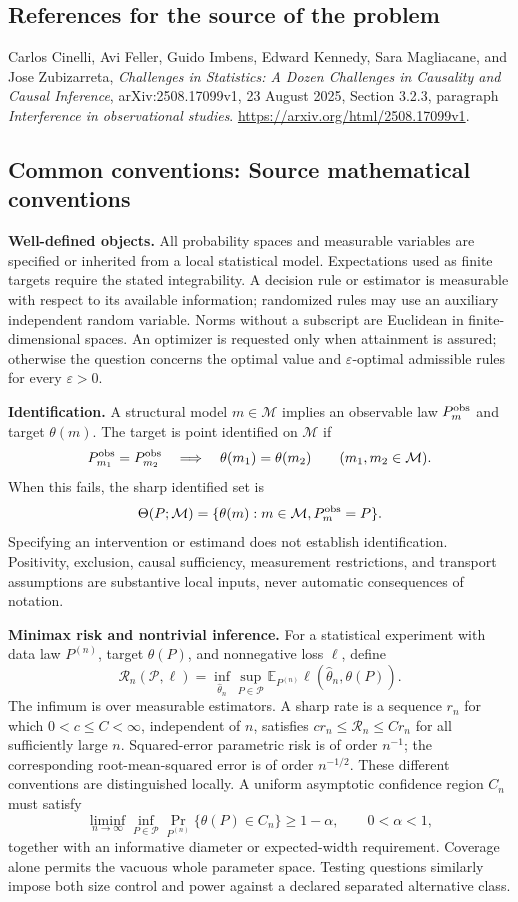 \documentclass[11pt,a4paper]{article}
\newcommand{\E}{\mathbb E}
\begin{document}
\subsection*{References for the source of the problem}
Carlos Cinelli, Avi Feller, Guido Imbens, Edward Kennedy, Sara Magliacane, and Jose Zubizarreta, \emph{Challenges in Statistics: A Dozen Challenges in Causality and Causal Inference}, arXiv:2508.17099v1, 23 August 2025, Section 3.2.3, paragraph \emph{Interference in observational studies}. \url{https://arxiv.org/html/2508.17099v1}.

\subsection*{Common conventions: Source mathematical conventions}

\textbf{Well-defined objects.}
All probability spaces and measurable variables are specified or inherited
from a local statistical model. Expectations used as finite targets require
the stated integrability. A decision rule or estimator is measurable with
respect to its available information; randomized rules may use an auxiliary
independent random variable. Norms without a subscript are Euclidean in
finite-dimensional spaces. An optimizer is requested only when attainment
is assured; otherwise the question concerns the optimal value and
$\varepsilon$-optimal admissible rules for every $\varepsilon>0$.

\textbf{Identification.}
A structural model $m\in\mathcal M$ implies an observable law
$P_m^{\rm obs}$ and target $\theta(m)$. The target is point identified on
$\mathcal M$ if
\[
 P_{m_1}^{\rm obs}=P_{m_2}^{\rm obs}
 \quad\Longrightarrow\quad\theta(m_1)=\theta(m_2)
 \qquad(m_1,m_2\in\mathcal M).
\]
When this fails, the sharp identified set is
\[
 \Theta(P;\mathcal M)=\{\theta(m):m\in\mathcal M,
                                  P_m^{\rm obs}=P\}.
\]
Specifying an intervention or estimand does not establish identification.
Positivity, exclusion, causal sufficiency, measurement restrictions, and
transport assumptions are substantive local inputs, never automatic
consequences of notation.

\textbf{Minimax risk and nontrivial inference.}
For a statistical experiment with data law $P^{(n)}$, target $\theta(P)$,
and nonnegative loss $\ell$, define
\[
 \mathcal R_n(\mathcal P,\ell)
   =\inf_{\widehat\theta_n}\sup_{P\in\mathcal P}
      \E_{P^{(n)}}\ell(\widehat\theta_n,\theta(P)).
\]
The infimum is over measurable estimators. A sharp rate is a sequence
$r_n$ for which $0<c\leq C<\infty$, independent of $n$, satisfies
$c r_n\leq\mathcal R_n\leq C r_n$ for all sufficiently large $n$.
Squared-error parametric risk is of order $n^{-1}$; the corresponding
root-mean-squared error is of order $n^{-1/2}$. These different conventions
are distinguished locally. A uniform asymptotic confidence region $C_n$
must satisfy
\[
 \liminf_{n\to\infty}\inf_{P\in\mathcal P}
     \Pr_{P^{(n)}}\{\theta(P)\in C_n\}\geq 1-\alpha,
 \qquad 0<\alpha<1,
\]
together with an informative diameter or expected-width requirement.
Coverage alone permits the vacuous whole parameter space. Testing questions
similarly impose both size control and power against a declared separated
alternative class.
\end{document}
